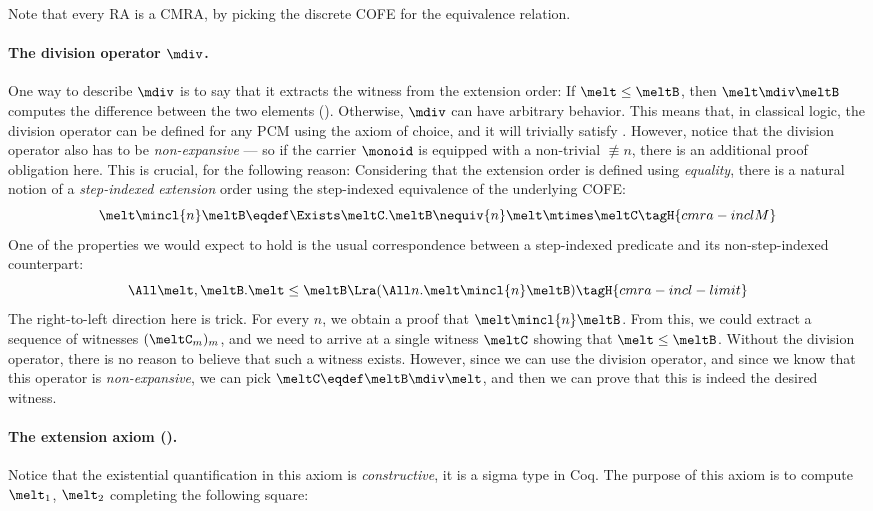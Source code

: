 Note that every RA is a CMRA, by picking the discrete COFE for the equivalence relation.


\paragraph{The division operator $\mdiv$.}
One way to describe $\mdiv$ is to say that it extracts the witness from the extension order: If $\melt \leq \meltB$, then $\melt \mdiv \meltB$ computes the difference between the two elements ().
Otherwise, $\mdiv$ can have arbitrary behavior.
This means that, in classical logic, the division operator can be defined for any PCM using the axiom of choice, and it will trivially satisfy .
However, notice that the division operator also has to be \emph{non-expansive} --- so if the carrier $\monoid$ is equipped with a non-trivial $\nequiv{n}$, there is an additional proof obligation here.
This is crucial, for the following reason:
Considering that the extension order is defined using \emph{equality}, there is a natural notion of a \emph{step-indexed extension} order using the step-indexed equivalence of the underlying COFE:
\[ \melt \mincl{n} \meltB \eqdef \Exists \meltC. \meltB \nequiv{n} \melt \mtimes \meltC \tagH{cmra-inclM} \]
One of the properties we would expect to hold is the usual correspondence between a step-indexed predicate and its non-step-indexed counterpart:
\[ \All \melt, \meltB. \melt \leq \meltB \Lra (\All n. \melt \mincl{n} \meltB) \tagH{cmra-incl-limit} \]
The right-to-left direction here is trick.
For every $n$, we obtain a proof that $\melt \mincl{n} \meltB$.
From this, we could extract a sequence of witnesses $(\meltC_m)_{m}$, and we need to arrive at a single witness $\meltC$ showing that $\melt \leq \meltB$.
Without the division operator, there is no reason to believe that such a witness exists.
However, since we can use the division operator, and since we know that this operator is \emph{non-expansive}, we can pick $\meltC \eqdef \meltB \mdiv \melt$, and then we can prove that this is indeed the desired witness.

\paragraph{The extension axiom ().}
Notice that the existential quantification in this axiom is \emph{constructive}, \ie it is a sigma type in Coq.
The purpose of this axiom is to compute $\melt_1$, $\melt_2$ completing the following square:


